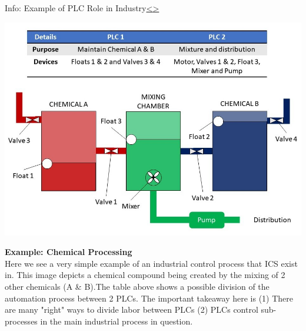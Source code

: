 \documentclass[12pt]{extarticle}
\newenvironment{instructionblock}{\Large\bgroup}{\egroup}
\newcounter{next}
\newcounter{prev}
\begin{document}

\pagebreak
{}
\begin{slide}{Info: Example of PLC Role in Industry}{\hyperref[slide \theprev]{\textless}\hyperref[slide \thenext]{\textgreater}}
	\begin{instructionblock}
		\begin{center}
		\includegraphics[scale=0.46]{Images/IndustrialProcessExample01.jpg}
		\end{center}
	\end{instructionblock}
\end{slide}
\vfill
\noindent
\textbf{Example: Chemical Processing}\\
Here we see a very simple example of an industrial control process that ICS exist in. This image depicts a chemical compound being created by the mixing of 2 other chemicals (A \& B).The table above shows a possible division of the automation process between 2 PLCs. The important takeaway here is (1) There are many "right" ways to divide labor between PLCs (2) PLCs control sub-processes in the main industrial process in question. 

\end{document}
